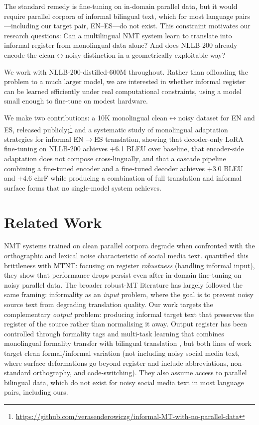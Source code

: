 \documentclass[11pt]{article}
\begin{document}
The standard remedy is fine-tuning on in-domain parallel data, but it would require parallel corpora of informal bilingual text, which for most language pairs---including our target pair, EN--ES---do not exist. This constraint motivates our research questions: Can a multilingual NMT system learn to translate into
informal register from monolingual data alone? And does NLLB-200 already encode the clean$\leftrightarrow$noisy distinction in a geometrically
exploitable way?

We work with NLLB-200-distilled-600M throughout. Rather than offloading the
problem to a much larger model, we are interested in whether informal register
can be learned efficiently under real computational constraints, using a model
small enough to fine-tune on modest hardware.

We make two contributions: a 10K monolingual clean$\leftrightarrow$noisy dataset
for EN and ES, released publicly;\footnote{\url{https://github.com/verasenderowiczg/informal-MT-with-no-parallel-data}} and a systematic study of
monolingual adaptation strategies for informal EN$\rightarrow$ES translation,
showing that decoder-only LoRA fine-tuning on NLLB-200 achieves $+$6.1 BLEU
over baseline, that encoder-side adaptation does not compose cross-lingually,
and that a cascade pipeline combining a fine-tuned encoder and a fine-tuned decoder achieves $+$3.0 BLEU and $+$4.6 chrF while producing a combination of full translation and informal surface forms that no single-model system achieves.
\section{Related Work}
\label{sec:related_work}

NMT systems trained on clean parallel corpora degrade when confronted with the orthographic and lexical noise characteristic of social media text. \citet{michel2018mtnt} quantified this brittleness with MTNT: focusing on register \emph{robustness} (handling informal input), they show that performance drops persist
even after in-domain fine-tuning on noisy parallel data. The broader robust-MT literature \citep{chu2018survey} has largely followed the same framing: informality as an \emph{input} problem, where the goal is to prevent noisy source text from
degrading translation quality. Our work targets the complementary \emph{output} problem: producing informal target text that preserves the register of the source rather than normalising it away. Output register has been controlled through formality tags \citep{niu2020formality} and multi-task learning that combines
monolingual formality transfer with bilingual translation \citep{niu2018multi}, but both lines of work target clean formal\slash informal variation (not including noisy social media text, where surface deformations go beyond register and include abbreviations, non-standard orthography, and code-switching). They also assume access to parallel bilingual data, which do not exist for noisy social media text in most language pairs, including ours.
\end{document}

